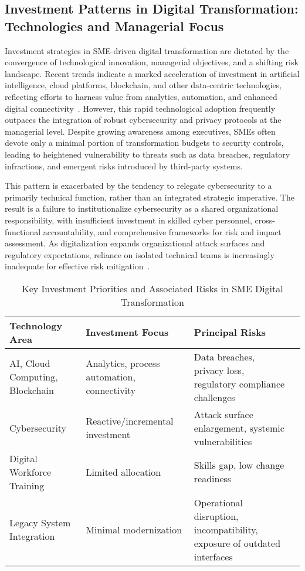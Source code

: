 \documentclass[sigconf]{acmart}
\begin{document}
\subsection{Investment Patterns in Digital Transformation: Technologies and Managerial Focus}

Investment strategies in SME-driven digital transformation are dictated by the convergence of technological innovation, managerial objectives, and a shifting risk landscape. Recent trends indicate a marked acceleration of investment in artificial intelligence, cloud platforms, blockchain, and other data-centric technologies, reflecting efforts to harness value from analytics, automation, and enhanced digital connectivity~\cite{ref35}. However, this rapid technological adoption frequently outpaces the integration of robust cybersecurity and privacy protocols at the managerial level. Despite growing awareness among executives, SMEs often devote only a minimal portion of transformation budgets to security controls, leading to heightened vulnerability to threats such as data breaches, regulatory infractions, and emergent risks introduced by third-party systems.

This pattern is exacerbated by the tendency to relegate cybersecurity to a primarily technical function, rather than an integrated strategic imperative. The result is a failure to institutionalize cybersecurity as a shared organizational responsibility, with insufficient investment in skilled cyber personnel, cross-functional accountability, and comprehensive frameworks for risk and impact assessment. As digitalization expands organizational attack surfaces and regulatory expectations, reliance on isolated technical teams is increasingly inadequate for effective risk mitigation~\cite{ref35}.

\begin{table*}[htbp]
\centering
\caption{Key Investment Priorities and Associated Risks in SME Digital Transformation}
\label{tab:investment_risks}
\begin{adjustbox}{max width=\textwidth}
\begin{tabular}{llll}
\toprule
\textbf{Technology Area} & \textbf{Investment Focus} & \textbf{Principal Risks} \\
\midrule
AI, Cloud Computing, Blockchain & Analytics, process automation, connectivity & Data breaches, privacy loss, regulatory compliance challenges \\
Cybersecurity & Reactive/incremental investment & Attack surface enlargement, systemic vulnerabilities \\
Digital Workforce Training & Limited allocation & Skills gap, low change readiness \\
Legacy System Integration & Minimal modernization & Operational disruption, incompatibility, exposure of outdated interfaces \\
\bottomrule
\end{tabular}
\end{adjustbox}
\end{table*}
\end{document}
